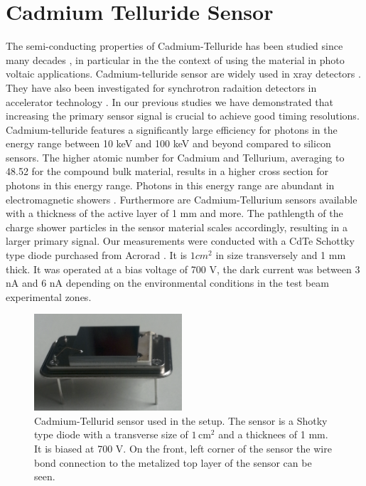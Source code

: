 %
%
%
\section{Cadmium Telluride Sensor}
\label{sec:siliconpad}
The semi-conducting properties of Cadmium-Telluride has been studied since many decades \cite{cdtegeneric}, in particular in the the context of using the material in photo voltaic applications.
Cadmium-telluride sensor are widely used in xray detectors \cite{cdtesensorsgeneric,cdtesensors1,cdtesensors2,cdtesensors3}. They have also been investigated for synchrotron radaition detectors in accelerator technology \cite{cdtelhc}.   
In our previous studies \cite{Anderson:2015gha,Ronzhin:2015pba,MCPShowerMaxPaper,Ronzhin2015288,Ronzhin201552,SiliconTiming} we have demonstrated that increasing the primary sensor signal is crucial to achieve good timing resolutions.  
Cadmium-telluride features a significantly large efficiency for photons in the energy range between 10 keV and 100 keV and beyond compared to silicon sensors. The higher atomic number for Cadmium and Tellurium, averaging to 48.52 for the compound bulk material, results in a higher cross section for photons in this energy range. 
Photons in this energy range are abundant in electromagnetic showers \cite{showercomposition}. 
Furthermore are Cadmium-Tellurium sensors available with a thickness of the active layer of 1 mm and more. The pathlength of the charge shower particles in the sensor material scales accordingly, resulting in a larger primary signal.   
%
Our measurements were conducted with a CdTe Schottky type diode purchased from Acrorad \cite{acrorad}. It is $1 cm^2$ in size transversely and 1 mm thick.
It was operated at a bias voltage of 700 V, the dark current was between 3 nA and 6 nA depending on the environmental conditions in the test beam experimental zones.     
%
\begin{figure}[htbp] 
\centering
\includegraphics[width=0.49\textwidth]{figures/CdTeSensor.png} 
\caption{Cadmium-Tellurid sensor used in the setup. The sensor is a Shotky type diode with a transverse size of $\mathrm{1\, cm^2}$ and a thicknees of 1 mm. It is biased at 700 V. On the front, left corner of the sensor the wire bond connection to the metalized top layer of the sensor can be seen.} 
\label{fig:CdTeSensor} 
\end{figure} 
